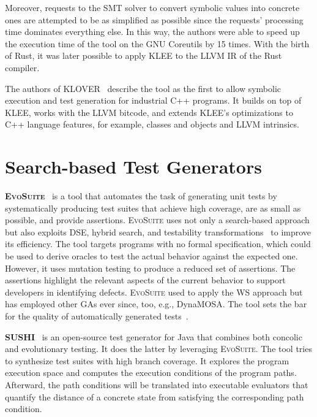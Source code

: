 \documentclass[paper=a4,%
  twoside,%
  BCOR4mm,%
  abstract=true,%
  toc=bibliography,%
  chapterprefix=true,%
  toc=bibliographynumbered,%
  open=right,%
  english,%
  pagesize=pdftex]{scrreprt}
\begin{document}
Moreover, requests to the \ac{SMT} solver to convert symbolic values into concrete ones are attempted to be as simplified as possible since the requests' processing time dominates everything else. In this way, the authors were able to speed up the execution time of the tool on the GNU Coreutils by 15 times. With the birth of Rust, it was later possible to apply KLEE to the LLVM IR of the Rust compiler.

The authors of \textsc{KLOVER}~\cite{Li2011} describe the tool as the first to allow symbolic execution and test generation for industrial C++ programs. It builds on top of \textsc{KLEE}, works with the LLVM bitcode, and extends \textsc{KLEE}'s optimizations to C++ language features, for example, classes and objects and LLVM intrinsics.


\section{Search-based Test Generators}
\textbf{\textsc{EvoSuite}}~\cite{Fraser_2011} is a tool that automates the task of generating unit tests by systematically producing test suites that achieve high coverage, are as small as possible, and provide assertions. \textsc{EvoSuite} uses not only a search-based approach but also exploits \ac{DSE}, hybrid search, and testability transformations~\cite{Harman2004} to improve its efficiency. The tool targets programs with no formal specification, which could be used to derive oracles to test the actual behavior against the expected one. However, it uses mutation testing to produce a reduced set of assertions. The assertions highlight the relevant aspects of the current behavior to support developers in identifying defects. \textsc{EvoSuite} used to apply the \ac{WS} approach but has employed other \acp{GA} ever since, too, e.g., \ac{DynaMOSA}. The tool sets the bar for the quality of automatically generated tests~\cite{Vogl2021,Panichella2020,Campos2019,Fraser2018,Fraser2016,Fraser2017}.

\textbf{SUSHI}~\cite{Braione2018} is an open-source test generator for Java that combines both concolic and evolutionary testing. It does the latter by leveraging \textsc{EvoSuite}. The tool tries to synthesize test suites with high branch coverage. It explores the program execution space and computes the execution conditions of the program paths. Afterward, the path conditions will be translated into executable evaluators that quantify the distance of a concrete state from satisfying the corresponding path condition.
\end{document}
